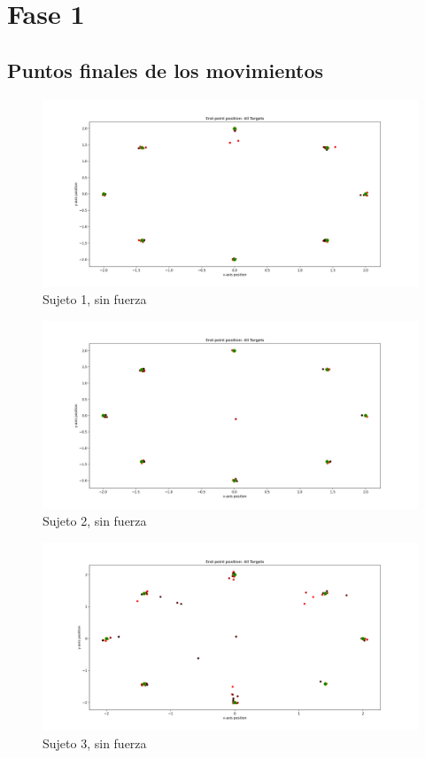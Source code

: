 \documentclass[a4paper,11pt, oneside]{book}
\begin{document}





\appendix

\chapter{Fase 1}
\section{Puntos finales de los movimientos}

\begin{figure}[H]
	\centering
	\includegraphics[width=\linewidth]{sujeto1/no_force/trayectorias_puntos}
	\caption{Sujeto 1, sin fuerza}
	\label{1-1-1}
\end{figure}
\begin{figure}[H]
	\centering
	\includegraphics[width=\linewidth]{sujeto2/no_force/trayectorias_puntos}
	\caption{Sujeto 2, sin fuerza}
	\label{2-1-1}
\end{figure}
\begin{figure}[H]
	\centering
	\includegraphics[width=\linewidth]{sujeto3/no_force/trayectorias_puntos}
	\caption{Sujeto 3, sin fuerza}
	\label{3-1-1}
\end{figure}
\end{document}
